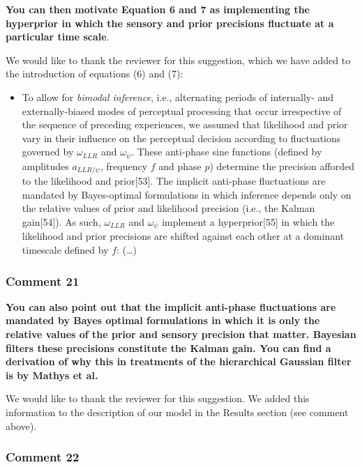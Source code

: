 \documentclass[
]{article}
\providecommand{\tightlist}{%
  \setlength{\itemsep}{0pt}\setlength{\parskip}{0pt}}
\begin{document}
\textbf{You can then motivate Equation 6 and 7 as implementing the
hyperprior in which the sensory and prior precisions fluctuate at a
particular time scale}.

We would like to thank the reviewer for this suggestion, which we have
added to the introduction of equations (6) and (7):

\begin{itemize}
\tightlist
\item
  To allow for \emph{bimodal inference}, i.e., alternating periods of
  internally- and externally-biased modes of perceptual processing that
  occur irrespective of the sequence of preceding experiences, we
  assumed that likelihood and prior vary in their influence on the
  perceptual decision according to fluctuations governed by
  \(\omega_{LLR}\) and \(\omega_{\psi}\). These anti-phase sine
  functions (defined by amplitudes \(a_{LLR/\psi}\), frequency \(f\) and
  phase \(p\)) determine the precision afforded to the likelihood and
  prior{[}53{]}. The implicit anti-phase fluctuations are mandated by
  Bayes-optimal formulations in which inference depends only on the
  relative values of prior and likelihood precision (i.e., the Kalman
  gain{[}54{]}). As such, \(\omega_{LLR}\) and \(\omega_{\psi}\)
  implement a hyperprior{[}55{]} in which the likelihood and prior
  precisions are shifted against each other at a dominant timescale
  defined by \(f\): (\ldots)
\end{itemize}

\hypertarget{comment-21}{%
\subsubsection{Comment 21}\label{comment-21}}

\textbf{You can also point out that the implicit anti-phase fluctuations
are mandated by Bayes optimal formulations in which it is only the
relative values of the prior and sensory precision that matter. Bayesian
filters these precisions constitute the Kalman gain. You can find a
derivation of why this in treatments of the hierarchical Gaussian filter
is by Mathys et al.}

We would like to thank the reviewer for this suggestion. We added this
information to the description of our model in the Results section (see
comment above).

\hypertarget{comment-22}{%
\subsubsection{Comment 22}\label{comment-22}}
\end{document}
